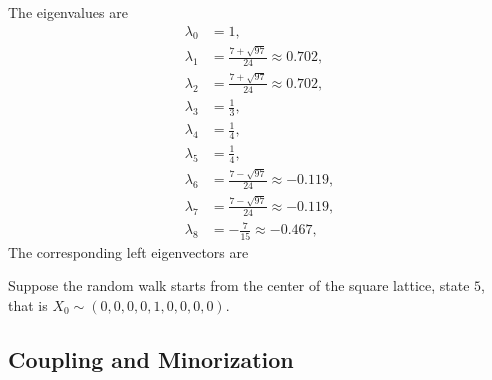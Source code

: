 \documentclass[12pt]{article}
\begin{document}
The eigenvalues are
\begin{align*}
    \lambda_0 &= 1, \\
    \lambda_1 &= \frac{7 + \sqrt{97}}{24} \approx 0.702, \\
    \lambda_2 &= \frac{7 + \sqrt{97}}{24} \approx 0.702, \\
    \lambda_3 &= \frac{1}{3}, \\
    \lambda_4 &= \frac{1}{4}, \\
    \lambda_5 &= \frac{1}{4}, \\
    \lambda_6 &= \frac{7 - \sqrt{97}}{24} \approx -0.119, \\
    \lambda_7 &= \frac{7 - \sqrt{97}}{24} \approx -0.119, \\
    \lambda_8 &= -\frac{7}{15} \approx -0.467,
\end{align*}
The corresponding left eigenvectors are

Suppose the random walk starts from the center of the square lattice,
state \( 5 \), that is \( X_0 \sim (0,0,0,0,1,0,0,0,0) \).

\subsection*{Coupling and Minorization}
\end{document}
